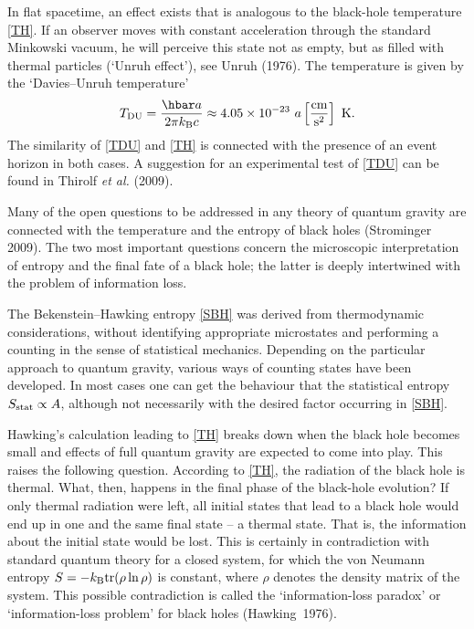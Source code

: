 \documentclass[12pt]{article}
\newcommand{\be}{\begin{equation}}
\newcommand{\ee}{\end{equation}}
\newcommand{\lb}{\label}
\begin{document}
In flat spacetime, an effect exists that is analogous to the
black-hole temperature \eqref{TH}. If an observer moves with constant
acceleration through the standard Minkowski vacuum, he will perceive this
state not as empty, but as filled with thermal particles (`Unruh
effect'), see Unruh (1976). The temperature is given by the
`Davies--Unruh temperature' 
\be 
\lb{TDU}
T_{\rm DU}= \frac{\hbar a}{2\pi k_{\rm B}c}\approx 4.05\times 10^{-23}
\ a\left[\frac{\rm cm}{{\rm s}^2}\right]\ {\rm K} .
\ee
The similarity of \eqref{TDU} and \eqref{TH} is connected with the
presence of an event horizon in both cases. A suggestion for an
experimental test of \eqref{TDU} can be found in Thirolf {\em et al.}
(2009). 

Many of the open questions to be addressed
in any theory of quantum gravity are connected with the temperature
and the entropy of black holes (Strominger 2009). 
The two most important questions
concern the microscopic interpretation of entropy
and the final fate of a black hole; the latter is deeply intertwined
with the problem of information loss.

The Bekenstein--Hawking entropy \eqref{SBH} was derived from
thermodynamic considerations, without identifying appropriate
microstates and performing a counting in the sense of statistical
mechanics. Depending on the particular approach to quantum gravity, various ways
of counting states have been developed. In most cases one can get the
behaviour that the statistical entropy $S_{\rm stat}\propto A$,
although not necessarily with the desired factor occurring in
\eqref{SBH}. 

Hawking's calculation leading to \eqref{TH} breaks down when the black
hole becomes small and effects of full quantum gravity are expected to
come into play. This raises the following question. According to
\eqref{TH}, the radiation of the black hole is thermal. What, then,
happens in the final phase of the black-hole evolution? If only
thermal radiation were left, all initial states that lead to a black
hole would end up in one and the same final state -- a thermal state.
That is, the information about the initial state would be lost. This
is certainly in contradiction with standard quantum theory for a
closed system, for which the von Neumann entropy $S=-k_{\rm B}{\rm
  tr}(\rho\ln\rho)$ is constant, where $\rho$ denotes the density
matrix of the system. This possible contradiction is called
 the `information-loss
paradox' or `information-loss problem' for black holes
(Hawking~1976). 
\end{document}
